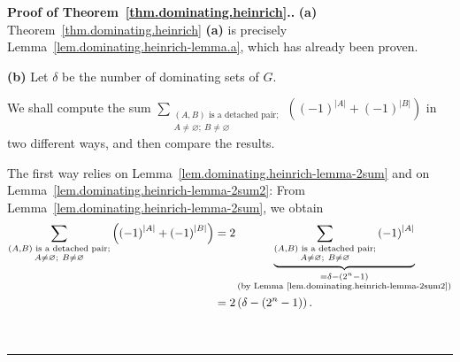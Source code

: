 \documentclass[numbers=enddot,12pt,final,onecolumn,notitlepage]{scrartcl}%
\theoremstyle{definition}
\newenvironment{proof}[1][Proof]{\noindent\textbf{#1.} }{\ \rule{0.5em}{0.5em}}
\let\sumnonlimits\sum
\renewcommand{\sum}{\sumnonlimits\limits}
\newcommand{\abs}[1]{\left| #1 \right|}
\newcommand{\tup}[1]{\left( #1 \right)}
\begin{document}
\begin{proof}[Proof of Theorem~\ref{thm.dominating.heinrich}.]
\textbf{(a)} Theorem~\ref{thm.dominating.heinrich} \textbf{(a)} is
precisely Lemma~\ref{lem.dominating.heinrich-lemma.a}, which has
already been proven.

\textbf{(b)} Let $\delta$ be the number of dominating sets of $G$.

We shall compute the sum
$\sum_{\substack{\tup{A, B} \text{ is a detached pair}; \\
                A \neq \varnothing; \  B \neq \varnothing}}
  \tup{\tup{-1}^{\abs{A}} + \tup{-1}^{\abs{B}}}$
in two different ways, and then compare the results.

The first way relies on
Lemma~\ref{lem.dominating.heinrich-lemma-2sum} and on
Lemma~\ref{lem.dominating.heinrich-lemma-2sum2}:
From Lemma~\ref{lem.dominating.heinrich-lemma-2sum}, we obtain
\begin{align}
\sum_{\substack{\tup{A, B} \text{ is a detached pair}; \\
                A \neq \varnothing; \  B \neq \varnothing}}
  \tup{\tup{-1}^{\abs{A}} + \tup{-1}^{\abs{B}}}
&= 2
\underbrace{
\sum_{\substack{\tup{A, B} \text{ is a detached pair}; \\
                A \neq \varnothing; \  B \neq \varnothing}}
  \tup{-1}^{\abs{A}}
}_{\substack{= \delta - \tup{2^n - 1} \\
        \text{(by Lemma~\ref{lem.dominating.heinrich-lemma-2sum2})}}}
\nonumber \\
&= 2 \tup{\delta - \tup{2^n - 1}} .
\label{pf.thm.dominating.heinrich.1}
\end{align}


\end{proof}
\end{document}
